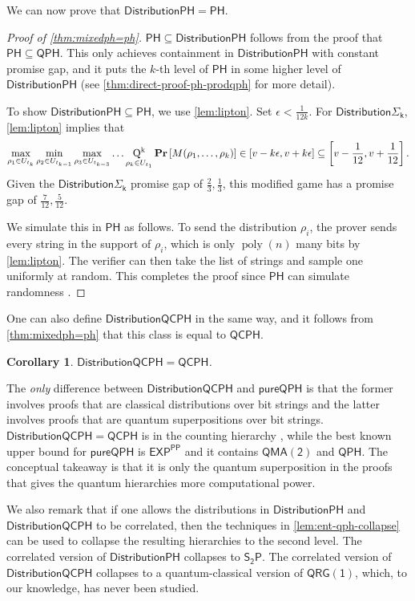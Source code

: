 \documentclass[11pt]{article}
\newtheorem{corollary}[theorem]{Corollary}
\theoremstyle{definition}
\renewcommand{\Pr}{\mathop{\bf Pr\/}}
\DeclareMathOperator{\poly}{poly}
\newcommand{\class}[1]{\ensuremath{\mathsf{#1}}\xspace}
\newcommand{\EXP}{\class{EXP}}
\newcommand{\QMAk}[1][k]{\class{QMA(#1)}}
\newcommand{\QMAtwo}{\QMAk[2]}
\newcommand{\QRGk}[1][k]{\class{QRG(#1)}}
\newcommand{\QRGone}{\QRGk[1]}
\newcommand{\PP}{\class{PP}}
\newcommand{\PH}{\class{PH}}
\newcommand{\QCPH}{\class{QCPH}}
\newcommand{\QPH}{\class{QPH}}
\newcommand{\pureQPH}{\class{pureQPH}}
\newcommand{\StwoP}{\class{S_{2}P}}
\newcommand{\distributionPH}{\mixedPH}
\newcommand{\distributionQCPH}{\mathsf{DistributionQCPH}}
\newcommand{\mixedPH}{\class{DistributionPH}}
\newcommand{\mixedSigmai}[1][i]{\mathsf{Distribution\Sigma_{#1}}}
\begin{document}
We can now prove that $\mixedPH = \PH$. 

\begin{proof}[Proof of \cref{thm:mixedph=ph}]
    $\PH \subseteq \mixedPH$ follows from the proof that $\PH\subseteq \QPH$.
    This only achieves containment in $\mixedPH$ with constant promise gap, and it puts the $k$-th level of $\PH$ in some higher level of $\mixedPH$ (see \cref{thm:direct-proof-ph-prodqph} for more detail).
    
    To show $\mixedPH \subseteq \PH$, we use \cref{lem:lipton}.
    Set $\epsilon < \frac{1}{12k}$.
    For $\mixedSigmai[k]$, \cref{lem:lipton} implies that
    \[
        \max_{\rho_1\in U_{t_k}} \min_{\rho_2\in U_{t_{k-1}}} \max_{\rho_3 \in U_{t_{k-3}}} \dots \operatorname*{Q^k}_{\rho_k \in U_{t_1}} \Pr\left[M(\rho_1,\dots,\rho_k)\right] \in [v - k\epsilon, v+k\epsilon] \subseteq \left[v-\frac{1}{12} , v+\frac{1}{12}\right].
    \]
    Given the $\mixedSigmai[k]$ promise gap of $\frac{2}{3},\frac{1}{3}$, this modified game has a promise gap of $\frac{7}{12},\frac{5}{12}$.
    
    We simulate this in $\PH$ as follows. To send the distribution $\rho_i$, the prover sends every string in the support of $\rho_i$, which is only $\poly(n)$ many bits by \cref{lem:lipton}. The verifier can then take the list of strings and sample one uniformly at random. 
    This completes the proof since $\PH$ can simulate randomness \cite{sipser1983complexity, LAUTEMANN1983215}. 
\end{proof}


One can also define $\distributionQCPH$ in the same way, and it follows from \cref{thm:mixedph=ph} that this class is equal to $\QCPH$. 
\begin{corollary}\label{cor:distqcph=qcph}
    $\distributionQCPH = \QCPH$.
\end{corollary}

The \emph{only} difference between $\distributionQCPH$ and $\pureQPH$ is that the former involves proofs that are classical distributions over bit strings and the latter involves proofs that are quantum superpositions over bit strings.
$\distributionQCPH = \QCPH$  is in the counting hierarchy \cite{GSSSY22_qph}, while the best known upper bound for $\pureQPH$ is $\EXP^\PP$ \cite{agarwal2023quantum} and it contains $\QMAtwo$ and $\QPH$.
The conceptual takeaway is that it is only the quantum superposition in the proofs that gives the quantum hierarchies more computational power. 

We also remark that if one allows the distributions in $\distributionPH$ and $\distributionQCPH$ to be correlated, then the techniques in \cref{lem:ent-qph-collapse} can be used to collapse the resulting hierarchies to the second level. The correlated version of $\distributionPH$ collapses to $\StwoP$. 
The correlated version of $\distributionQCPH$ collapses to a quantum-classical version of $\QRGone$, which, to our knowledge, has never been studied. 
\end{document}
